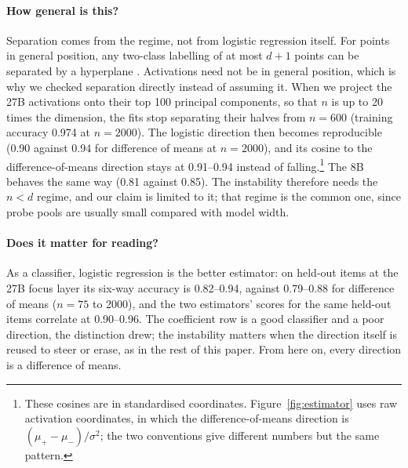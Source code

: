 \documentclass{article}
\begin{document}
\paragraph{How general is this?} Separation comes from the regime, not from logistic regression itself. For points in general position, any two-class labelling of at most $d + 1$ points can be separated by a hyperplane \citep{cover1965geometrical,candes2020phase}. Activations need not be in general position, which is why we checked separation directly instead of assuming it. When we project the 27B activations onto their top 100 principal components, so that $n$ is up to 20 times the dimension, the fits stop separating their halves from $n = 600$ (training accuracy 0.974 at $n = 2000$). The logistic direction then becomes reproducible (0.90 against 0.94 for difference of means at $n = 2000$), and its cosine to the difference-of-means direction stays at 0.91--0.94 instead of falling.\footnote{These cosines are in standardised coordinates. Figure~\ref{fig:estimator} uses raw activation coordinates, in which the difference-of-means direction is $(\mu_+ - \mu_-)/\sigma^2$; the two conventions give different numbers but the same pattern.} The 8B behaves the same way (0.81 against 0.85). The instability therefore needs the $n < d$ regime, and our claim is limited to it; that regime is the common one, since probe pools are usually small compared with model width.

\paragraph{Does it matter for reading?} As a classifier, logistic regression is the better estimator: on held-out items at the 27B focus layer its six-way accuracy is 0.82--0.94, against 0.79--0.88 for difference of means ($n = 75$ to 2000), and the two estimators' scores for the same held-out items correlate at 0.90--0.96. The coefficient row is a good classifier and a poor direction, the distinction \citet{marks2023geometry} drew; the instability matters when the direction itself is reused to steer or erase, as in the rest of this paper. From here on, every direction is a difference of means.

\end{document}
